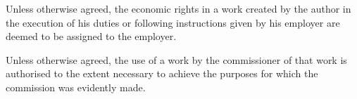 \begin{contract}
\label{Par:WorksMadeInTheCourseOfEmployment}
\Sentence Unless otherwise agreed, the economic rights in a work created by the author
in the execution of his duties or following instructions given by his employer
are deemed to be assigned to the employer.

\label{Par:WorksMadeOncommission}
\Sentence Unless otherwise agreed, the use of a work by the commissioner of that work
is authorised to the extent necessary to achieve the purposes for which the
commission was evidently made.

\end{contract}
